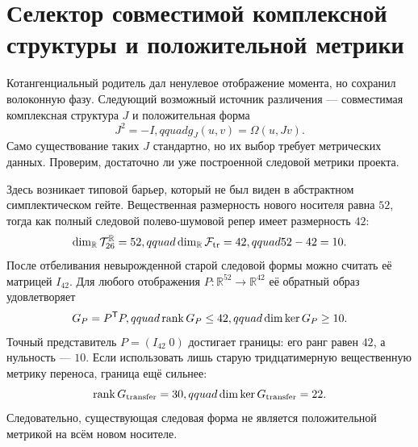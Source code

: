 \chapter{Селектор совместимой комплексной структуры и положительной метрики}
\label{ch:v8-horizontal-phase-cotangent-complex-structure-metric-selector-gate}

Котангенциальный родитель дал ненулевое отображение момента, но сохранил
волоконную фазу. Следующий возможный источник различения --- совместимая
комплексная структура $J$ и положительная форма
\begin{equation}
 J^2=-I,qquad g_J(u,v)=\Omega(u,Jv).
 \label{eq:v8-cotangent-compatible-complex-structure}
\end{equation}
Само существование таких $J$ стандартно, но их выбор требует метрических
данных. Проверим, достаточно ли уже построенной следовой метрики проекта.

Здесь возникает типовой барьер, который не был виден в абстрактном
симплектическом гейте. Вещественная размерность нового носителя равна $52$,
тогда как полный следовой полево-шумовой репер имеет размерность $42$:
\begin{equation}
 \dim_{\mathbb R}\mathcal T_{26}^{\mathbb R}=52,qquad
 \dim_{\mathbb R}\mathcal F_{\rm tr}=42,qquad 52-42=10.
 \label{eq:v8-cotangent-trace-carrier-mismatch}
\end{equation}
После отбеливания невырожденной старой следовой формы можно считать её
матрицей $I_{42}$. Для любого отображения
$P:\mathbb R^{52}\to\mathbb R^{42}$ её обратный образ удовлетворяет
\begin{equation}
 G_P=P^{\mathsf T}P,qquad
 \operatorname{rank} G_P\leq42,qquad \dim\ker G_P\geq10.
 \label{eq:v8-cotangent-trace-pullback-bound}
\end{equation}
Точный представитель $P=(I_{42}\;0)$ достигает границы: его ранг равен
$42$, а нульность --- $10$. Если использовать лишь старую тридцатимерную
вещественную метрику переноса, граница ещё сильнее:
\begin{equation}
 \operatorname{rank} G_{\rm transfer}=30,qquad
 \dim\ker G_{\rm transfer}=22.
 \label{eq:v8-cotangent-transfer-pullback-bound}
\end{equation}
Следовательно, существующая следовая форма не является положительной
метрикой на всём новом носителе.

